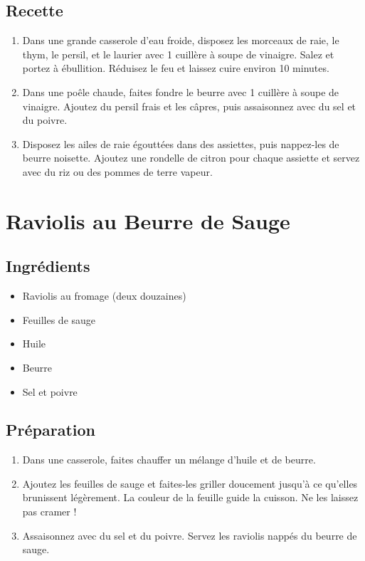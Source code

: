 \subsection{Recette}\label{recette-7}

\begin{enumerate}
\def\labelenumi{\arabic{enumi}.}

\item
  Dans une grande casserole d'eau froide, disposez les morceaux de raie,
  le thym, le persil, et le laurier avec 1 cuillère à soupe de vinaigre.
  Salez et portez à ébullition. Réduisez le feu et laissez cuire environ
  10 minutes.
\item
  Dans une poêle chaude, faites fondre le beurre avec 1 cuillère à soupe
  de vinaigre. Ajoutez du persil frais et les câpres, puis assaisonnez
  avec du sel et du poivre.
\item
  Disposez les ailes de raie égouttées dans des assiettes, puis
  nappez-les de beurre noisette. Ajoutez une rondelle de citron pour
  chaque assiette et servez avec du riz ou des pommes de terre vapeur.
\end{enumerate}

\section{Raviolis au Beurre de Sauge}\label{raviolis-au-beurre-de-sauge}

\subsection{Ingrédients}\label{ingruxe9dients-12}

\begin{itemize}

\item
  Raviolis au fromage (deux douzaines)
\item
  Feuilles de sauge
\item
  Huile
\item
  Beurre
\item
  Sel et poivre
\end{itemize}

\subsection{Préparation}\label{pruxe9paration-4}

\begin{enumerate}
\def\labelenumi{\arabic{enumi}.}

\item
  Dans une casserole, faites chauffer un mélange d'huile et de beurre.
\item
  Ajoutez les feuilles de sauge et faites-les griller doucement jusqu'à
  ce qu'elles brunissent légèrement. La couleur de la feuille guide la
  cuisson. Ne les laissez pas cramer !
\item
  Assaisonnez avec du sel et du poivre. Servez les raviolis nappés du
  beurre de sauge.
\end{enumerate}

